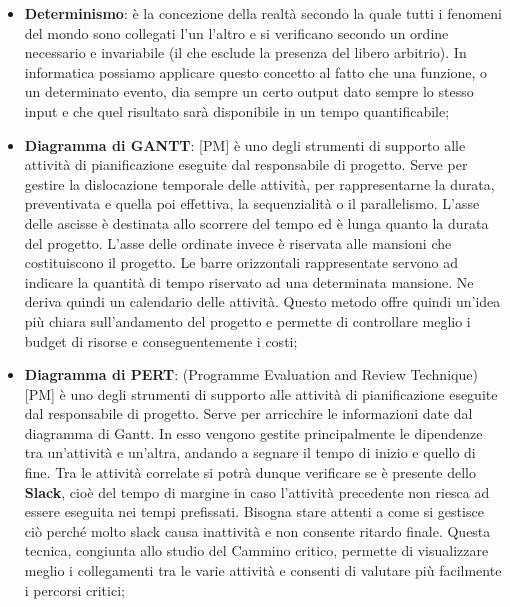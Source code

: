 \begin{itemize}
	\item \textbf{Determinismo}: è la concezione della realtà secondo la quale tutti i fenomeni del mondo sono collegati l’un l’altro e si verificano secondo un ordine necessario e invariabile (il che esclude la presenza del libero arbitrio). \newline
In informatica possiamo applicare questo concetto al fatto che una funzione, o un determinato evento, dia sempre un certo output dato sempre lo stesso input e che quel risultato sarà disponibile in un tempo quantificabile;

	\item \textbf {Diagramma di GANTT}: [PM] è uno degli strumenti di supporto alle attività di pianificazione eseguite dal responsabile di progetto. \newline
Serve per gestire la dislocazione temporale delle attività, per rappresentarne la durata, preventivata e quella poi effettiva, la sequenzialità o il parallelismo. \newline
L'asse delle ascisse è destinata allo scorrere del tempo ed è lunga quanto la durata del progetto. \newline
L'asse delle ordinate invece è riservata alle mansioni che costituiscono il progetto. \newline
Le barre orizzontali rappresentate servono ad indicare la quantità di tempo riservato ad una determinata mansione. Ne deriva quindi un calendario delle attività. \newline
Questo metodo offre quindi un'idea più chiara sull'andamento del progetto e permette di controllare meglio i budget di risorse e conseguentemente i costi;

	\item \textbf {Diagramma di PERT}: (Programme Evaluation and Review Technique) [PM] è uno degli strumenti di supporto alle attività di pianificazione eseguite dal responsabile di progetto. \newline
Serve per arricchire le informazioni date dal diagramma di Gantt. In esso vengono gestite principalmente le dipendenze tra un'attività e un'altra, andando a segnare il tempo di inizio e quello di fine. Tra le attività correlate si potrà dunque verificare se è presente dello \textbf{Slack}, cioè del tempo di margine in caso l'attività precedente non riesca ad essere eseguita nei tempi prefissati. Bisogna stare attenti a come si gestisce ciò perché molto slack causa inattività e non consente ritardo finale.   \newline
Questa tecnica, congiunta allo studio del Cammino critico, permette di visualizzare meglio i collegamenti tra le varie attività e consenti di valutare più facilmente i percorsi critici;


\end{itemize}
